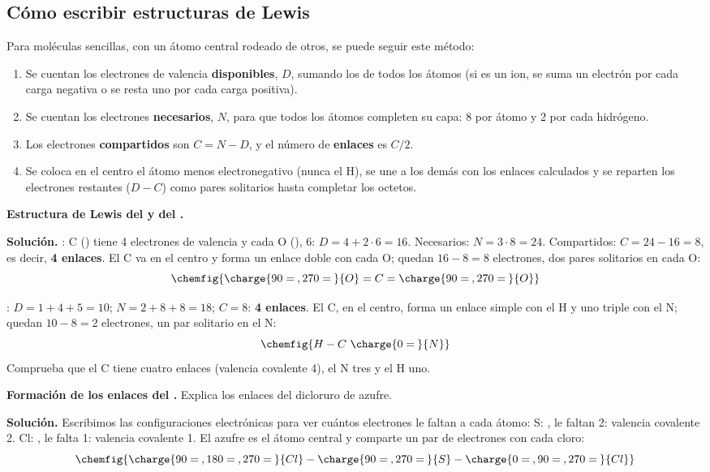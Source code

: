 \subsection{Cómo escribir estructuras de Lewis}

Para moléculas sencillas, con un átomo central rodeado de otros, se puede seguir este método:
\begin{enumerate}[label=\numberballgreen]
    \item Se cuentan los electrones de valencia \textbf{disponibles}, \(D\), sumando los de todos los átomos (si es un ion, se
    suma un electrón por cada carga negativa o se resta uno por cada carga positiva).
    \item Se cuentan los electrones \textbf{necesarios}, \(N\), para que todos los átomos completen su capa: 8 por átomo y 2 por
    cada hidrógeno.
    \item Los electrones \textbf{compartidos} son \(C = N - D\), y el número de \textbf{enlaces} es \(C/2\).
    \item Se coloca en el centro el átomo menos electronegativo (nunca el H), se une a los demás con los enlaces calculados y se
    reparten los electrones restantes (\(D - C\)) como pares solitarios hasta completar los octetos.
\end{enumerate}

\begin{example}
    \textbf{Estructura de Lewis del  y del .}

    \textbf{Solución.} \textbf{}: C () tiene 4 electrones de valencia y cada O (), 6:
    \(D = 4 + 2 \cdot 6 = 16\). Necesarios: \(N = 3 \cdot 8 = 24\). Compartidos: \(C = 24 - 16 = 8\), es decir, \textbf{4
    enlaces}. El C va en el centro y forma un enlace doble con cada O; quedan \(16 - 8 = 8\) electrones, dos pares solitarios en
    cada O:
    \[ \chemfig{\charge{90=\:,270=\:}{O}=C=\charge{90=\:,270=\:}{O}} \]

    \textbf{}: \(D = 1 + 4 + 5 = 10\); \(N = 2 + 8 + 8 = 18\); \(C = 8\): \textbf{4 enlaces}. El C, en el centro, forma un
    enlace simple con el H y uno triple con el N; quedan \(10 - 8 = 2\) electrones, un par solitario en el N:
    \[ \chemfig{H-C~\charge{0=\:}{N}} \]
    Comprueba que el C tiene cuatro enlaces (valencia covalente 4), el N tres y el H uno.
\end{example}

\begin{example}
    \textbf{Formación de los enlaces del .} Explica los enlaces del dicloruro de azufre.

    \textbf{Solución.} Escribimos las configuraciones electrónicas para ver cuántos electrones le faltan a cada átomo:
    S: , le faltan 2: valencia covalente 2. Cl: , le falta 1: valencia covalente 1.
    El azufre es el átomo central y comparte un par de electrones con cada cloro:
    \[ \chemfig{\charge{90=\:,180=\:,270=\:}{Cl}-\charge{90=\:,270=\:}{S}-\charge{0=\:,90=\:,270=\:}{Cl}} \]
\end{example}

